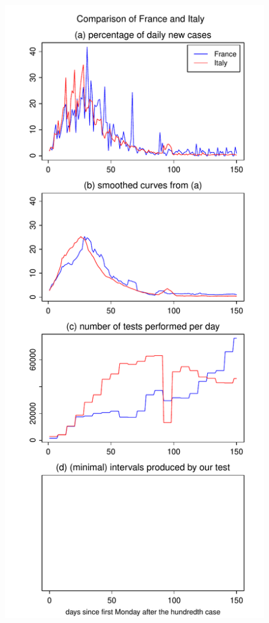 \documentclass[a4paper,12pt]{article}
\numberwithin{equation}{section}
\begin{document}
\begin{figure}[h!]
\begin{minipage}[t]{0.49\textwidth}
\includegraphics[width=\textwidth]{plots/FRA_vs_ITA_normalised}

\end{minipage}
\end{figure}
\end{document}
